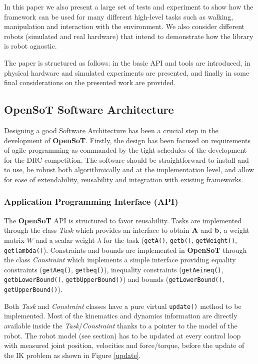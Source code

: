 In this paper we also present a large set of tests and experiment to show how the framework can be used for many different high-level tasks such as walking, manipulation and interaction with the environment. We also consider different robots (simulated and real hardware) that intend to demonstrate how the library is robot agnostic.

The paper is structured as follows: in \textbf{} the basic API and tools are introduced, in \textbf{}physical hardware and simulated  experiments are presented, and finally in \textbf{} some final considerations on the presented work are provided.

\subsection{OpenSoT Software Architecture}
\label{sec:software_architecture}
Designing a good Software Architecture has been a crucial step in the development of \textbf{OpenSoT}. Firstly, the design has been focused on requirements of agile programming as commanded by the tight schedules of the development for the DRC competition. The software should be straightforward to install and to use, be robust both algorithmically and at the implementation level, and allow for ease of extendability, reusability and integration with existing frameworks.

\subsubsection{Application Programming Interface (API)}
The \textbf{OpenSoT} API is structured to favor reusability.
Tasks are implemented through the class \emph{Task} which provides an interface to obtain $\mathbf{A}$ and $\mathbf{b}$, a weight matrix $W$ and a scalar weight $\lambda$ for the task (\texttt{\small getA()}, \texttt{\small getb()}, \texttt{\small getWeight()}, \texttt{\small getlambda()}).
Constraints and bounds are implemented in \textbf{OpenSoT} through the class \emph{Constraint} which implements a simple interface providing equality constraints (\texttt{\small getAeq()}, \texttt{\small getbeq()}), inequality constraints (\texttt{\small getAeineq()}, \texttt{\small getbLowerBound()}, \texttt{\small getbUpperBound()}) and bounds (\texttt{\small getLowerBound()}, \texttt{\small getUpperBound()}).

Both \emph{Task} and \emph{Constraint} classes have a pure virtual \texttt{\small update()} method to be implemented. Most of the kinematics and dynamics information are directly available inside the \emph{Task}/\emph{Constraint} thanks to a pointer to the model of the robot. The robot model (see  section) has to be updated at every control loop with measured joint position, velocities and force/torque, before the update of the IK problem as shown in Figure \ref{update}.

